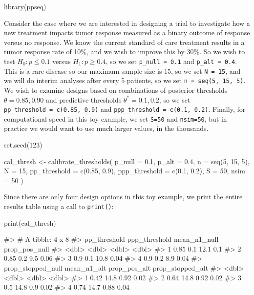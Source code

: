 \begin{Schunk}
\begin{Sinput}
library(ppseq)
\end{Sinput}
\end{Schunk}

Consider the case where we are interested in designing a trial to
investigate how a new treatment impacts tumor response measured as a
binary outcome of response versus no response. We know the current
standard of care treatment results in a tumor response rate of 10\%, and
we wish to improve this by 30\%. So we wish to test \(H_0: p \leq 0.1\)
versus \(H_1: p \geq 0.4\), so we set \texttt{p\_null\ =\ 0.1} and
\texttt{p\_alt\ =\ 0.4}. This is a rare disease so our maximum sample
size is 15, so we set \texttt{N\ =\ 15}, and we will do interim analyses
after every 5 patients, so we set \texttt{n\ =\ seq(5,\ 15,\ 5)}. We
wish to examine designs based on combinations of posterior thresholds
\(\theta = {0.85, 0.90}\) and predictive thresholds
\(\theta^*={0.1, 0.2}\), so we set
\texttt{pp\_threshold\ =\ c(0.85,\ 0.9)} and
\texttt{ppp\_threshold\ =\ c(0.1,\ 0.2)}. Finally, for computational
speed in this toy example, we set \texttt{S=50} and \texttt{nsim=50},
but in practice we would want to use much larger values, in the
thousands.

\begin{Schunk}
\begin{Sinput}
set.seed(123)

cal_thresh <-
  calibrate_thresholds(
    p_null = 0.1, 
    p_alt = 0.4,
    n = seq(5, 15, 5), 
    N = 15,
    pp_threshold = c(0.85, 0.9),
    ppp_threshold = c(0.1, 0.2),
    S = 50, 
    nsim = 50
    )
\end{Sinput}
\end{Schunk}

Since there are only four design options in this toy example, we print
the entire results table using a call to \texttt{print()}:

\begin{Schunk}
\begin{Sinput}
print(cal_thresh)
\end{Sinput}
\begin{Soutput}
#> # A tibble: 4 x 8
#>   pp_threshold ppp_threshold mean_n1_null prop_pos_null
#>          <dbl>         <dbl>        <dbl>         <dbl>
#> 1         0.85           0.1         12.1          0.1 
#> 2         0.85           0.2          9.5          0.06
#> 3         0.9            0.1         10.8          0.04
#> 4         0.9            0.2          8.9          0.04
#>   prop_stopped_null mean_n1_alt prop_pos_alt prop_stopped_alt
#>               <dbl>       <dbl>        <dbl>            <dbl>
#> 1              0.42        14.8         0.92             0.02
#> 2              0.64        14.8         0.92             0.02
#> 3              0.5         14.8         0.9              0.02
#> 4              0.74        14.7         0.88             0.04
\end{Soutput}
\end{Schunk}

